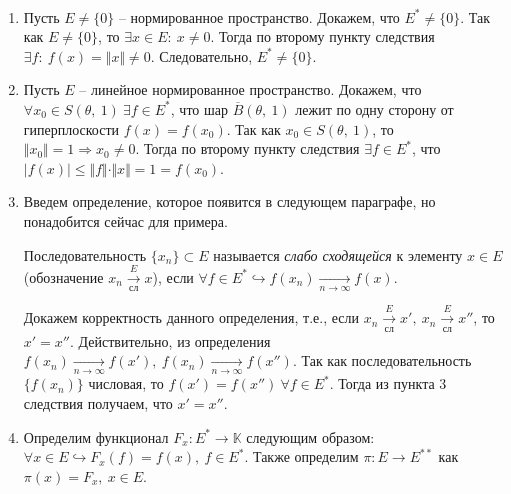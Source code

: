 \begin{example} ~
    \begin{enumerate}
        \item Пусть $\displaystyle E\neq \{0\}$ -- нормированное пространство. Докажем, что $\displaystyle E^{*} \neq \{0\}$. Так как $\displaystyle E\neq \{0\}$, то $\displaystyle \exists x\in E:\ x\neq 0$. Тогда по второму пункту следствия $\displaystyle \exists f:\ f( x) =\Vert x\Vert \neq 0$. Следовательно, $\displaystyle E^{*} \neq \{0\}$.
        \item Пусть $\displaystyle E$ -- линейное нормированное пространство. Докажем, что $\displaystyle \forall x_{0} \in S( \theta ,\ 1) \ \exists f\in E^{*}$, что шар $\displaystyle \overline{B}( \theta ,\ 1)$ лежит по одну сторону от гиперплоскости $\displaystyle f( x) =f( x_{0})$. Так как $\displaystyle x_{0} \in S( \theta ,\ 1)$, то $\displaystyle \Vert x_{0}\Vert =1\Rightarrow x_{0} \neq 0$. Тогда по второму пункту следствия $\displaystyle \exists f\in E^{*}$, что $\displaystyle | f( x)| \leqslant \Vert f\Vert \cdotp \Vert x\Vert =1=f( x_{0})$.
        \item Введем определение, которое появится в следующем параграфе, но понадобится сейчас для примера.
        \begin{definition}
            Последовательность $\displaystyle \{x_{n}\} \subset E$ называется \textit{слабо сходящейся} к элементу $\displaystyle x\in E$ (обозначение $\displaystyle x_{n}\xrightarrow[\text{сл}]{E} x$), если $\displaystyle \forall f\in E^{*} \hookrightarrow f( x_{n})\xrightarrow[n\rightarrow \infty ]{} f( x)$.
        \end{definition}
        Докажем корректность данного определения, т.е., если $\displaystyle x_{n}\xrightarrow[\text{сл}]{E} x',\ x_{n}\xrightarrow[\text{сл}]{E} x''$, то $\displaystyle x'=x''$. Действительно, из определения $\displaystyle f( x_{n})\xrightarrow[n\rightarrow \infty ]{} f( x') ,\ f( x_{n})\xrightarrow[n\rightarrow \infty ]{} f( x'')$. Так как последовательность $\displaystyle \{f( x_{n})\}$ числовая, то $\displaystyle f( x') =f( x'') \ \forall f\in E^{*}$. Тогда из пункта 3 следствия получаем, что $\displaystyle x'=x''$.
        \item Определим функционал $\displaystyle F_{x} :E^{*}\rightarrow \mathbb{K}$ следующим образом: $\displaystyle \forall x\in E\hookrightarrow F_{x}( f) =f( x) ,\ f\in E^{*}$. Также определим $\displaystyle \pi :E\rightarrow E^{**}$ как $\displaystyle \pi ( x) =F_{x} ,\ x\in E$.
        \begin{definition}

\end{definition}
\end{enumerate}
\end{example}
